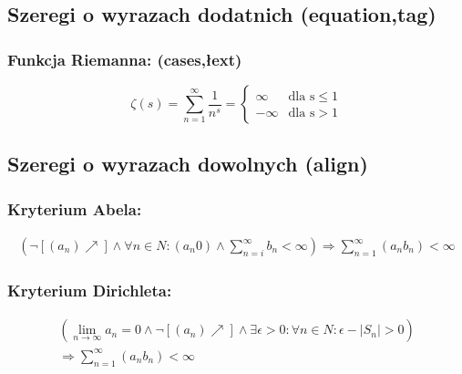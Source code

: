 \documentclass[12pt]{article}
\begin{document}
  \subsection{Szeregi o wyrazach dodatnich (equation,tag)} 
    \subsubsection{Funkcja Riemanna: (cases,łext)}
    
    \begin{equation}
    \zeta(s) = \sum_{n=1}^\infty \frac{1}{n^s} = \begin{cases} 
      \infty & \text{dla s} \leq 1 \\ 
      -\infty & \text{dla s} > 1
    \end{cases}\tag{0}
    \end{equation}

\subsection{Szeregi o wyrazach dowolnych (align)}
\subsubsection{Kryterium Abela:}
\begin{align} %
\left(\lnot\left[\left(a_{n}\right)\nearrow\right]\land\forall n \in N : \left(a_{n} 0\right)\land \sum\limits_{n=i}^{\infty} b_{n} < \infty \right)\Rightarrow\sum\limits_{n=1}^{\infty}\left(a_{n}b_{n}\right) < \infty
\end{align}
    
\subsubsection{Kryterium Dirichleta:}

\begin{align}
\left(\lim\limits_{n\rightarrow\infty}a_{n} = 0 \land \lnot \left[ \left(a_{n} \right) \nearrow \right] \land \exists \epsilon > 0 :
\forall n \in N : \epsilon - \left|S_{n}\right| > 0 \right) \nonumber\\
\Rightarrow \sum\limits_{n=1}^\infty \left(a_{n}b_{n} \right) < \infty
\end{align}
\end{document}
